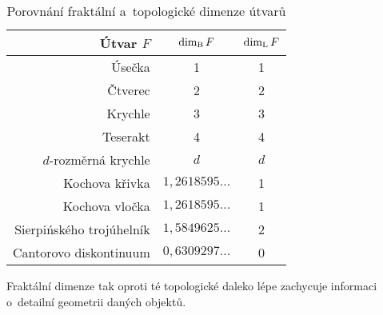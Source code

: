 \begin{table}[h]
    \centering
    \begin{tabular}{r|cc}
    Útvar $F$                & $\operatorname{dim_B}{F}$            & $\operatorname{dim_L}{F}$ \\\hline
    Úsečka                   & 1                     & 1          \\
    Čtverec                  & 2                     & 2          \\
    Krychle                  & 3                     & 3          \\
    Teserakt                 & 4                     & 4          \\
    $d$-rozměrná krychle     & $d$                   & $d$        \\
    Kochova křivka           & $1{,}2618595\dots$    & 1          \\
    Kochova vločka           & $1{,}2618595\dots$    & 1          \\
    Sierpińského trojúhelník & $1{,}5849625\dots$    & 2          \\
    Cantorovo diskontinuum   & $0{,}6309297\dots$    & 0      
    \end{tabular}
    \caption{Porovnání fraktální a~topologické dimenze útvarů}
    \label{table:fraktalni-topologicka-dimenze}
\end{table}
Fraktální dimenze tak oproti té topologické daleko lépe zachycuje informaci o~detailní geometrii daných objektů.